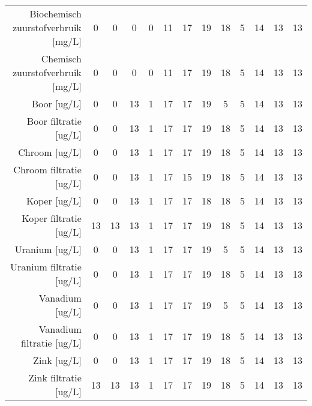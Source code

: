 \begin{tabular}{ r |c | c | c | c | c |c | c | c | c | c | c | c }
Biochemisch zuurstofverbruik [mg/L] &0 & 0 & 0 & 0 & 11 & 17 & 19 & 18 & 5 & 14 & 13 & 13 \\
Chemisch zuurstofverbruik [mg/L] &0 & 0 & 0 & 0 & 11 & 17 & 19 & 18 & 5 & 14 & 13 & 13 \\
Boor [ug/L] &0 & 0 & 13 & 1 & 17 & 17 & 19 & 5 & 5 & 14 & 13 & 13 \\
Boor filtratie [ug/L] &0 & 0 & 13 & 1 & 17 & 17 & 19 & 18 & 5 & 14 & 13 & 13 \\
Chroom [ug/L] &0 & 0 & 13 & 1 & 17 & 17 & 19 & 18 & 5 & 14 & 13 & 13 \\
Chroom filtratie [ug/L] &0 & 0 & 13 & 1 & 17 & 15 & 19 & 18 & 5 & 14 & 13 & 13 \\
Koper [ug/L] &0 & 0 & 13 & 1 & 17 & 17 & 18 & 18 & 5 & 14 & 13 & 13 \\
Koper filtratie [ug/L] &13 & 13 & 13 & 1 & 17 & 17 & 19 & 18 & 5 & 14 & 13 & 13 \\
Uranium [ug/L] &0 & 0 & 13 & 1 & 17 & 17 & 19 & 5 & 5 & 14 & 13 & 13 \\
Uranium filtratie [ug/L] &0 & 0 & 13 & 1 & 17 & 17 & 19 & 18 & 5 & 14 & 13 & 13 \\
Vanadium [ug/L] &0 & 0 & 13 & 1 & 17 & 17 & 19 & 5 & 5 & 14 & 13 & 13 \\
Vanadium filtratie [ug/L] &0 & 0 & 13 & 1 & 17 & 17 & 19 & 18 & 5 & 14 & 13 & 13 \\
Zink [ug/L] &0 & 0 & 13 & 1 & 17 & 17 & 19 & 18 & 5 & 14 & 13 & 13 \\
Zink filtratie [ug/L] &13 & 13 & 13 & 1 & 17 & 17 & 19 & 18 & 5 & 14 & 13 & 13 \\
\end{tabular}    
